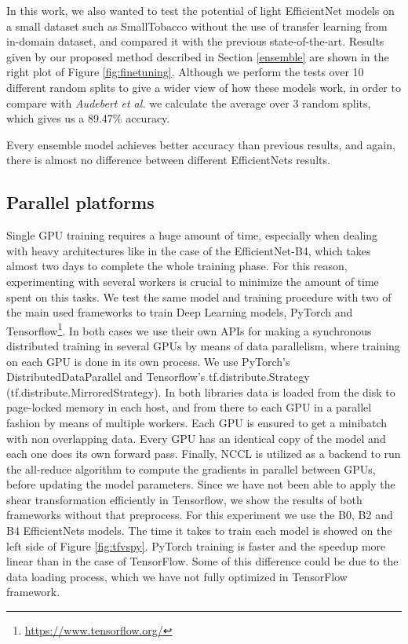\documentclass[runningheads]{llncs}
\begin{document}
In this work, we also wanted to test the potential of light EfficientNet models on a small dataset such as SmallTobacco without the use of transfer learning from in-domain dataset, and compared it with the previous state-of-the-art. Results given by our proposed method described in Section \ref{ensemble} are shown in the right plot of Figure \ref{fig:finetuning}. Although we perform the tests over 10 different random splits to give a wider view of how these models work, in order to compare with \textit{Audebert et al.} \cite{multimodal} we calculate the average over 3 random splits, which gives us a 89.47\% accuracy.

Every ensemble model achieves better accuracy than previous results, and again, there is almost no difference between different EfficientNets results.

\subsection{Parallel platforms}

Single GPU training requires a huge amount of time, especially when dealing with heavy architectures like in the case of the EfficientNet-B4, which takes almost two days to complete the whole training phase. For this reason, experimenting with several workers is crucial to minimize the amount of time spent on this tasks. We test the same model and training procedure with two of the main used frameworks to train Deep Learning models, PyTorch and Tensorflow\footnote{\url{https://www.tensorflow.org/}}. In both cases we use their own APIs for making a synchronous distributed training in several GPUs by means of data parallelism, where training on each GPU is done in its own process. We use PyTorch's DistributedDataParallel and Tensorflow's tf.distribute.Strategy (tf.distribute.MirroredStrategy). In both libraries data is loaded from the disk to page-locked memory in each host, and from there to each GPU in a parallel fashion by means of multiple workers. Each GPU is ensured to get a minibatch with non overlapping data. Every GPU has an identical copy of the model and each one does its own forward pass. Finally, NCCL is utilized as a backend to run the all-reduce algorithm to compute the gradients in parallel between GPUs, before updating the model parameters. Since we have not been able to apply the shear transformation efficiently in Tensorflow, we show the results of both frameworks without that preprocess.
For this experiment we use the B0, B2 and B4 EfficientNets models.  The time it takes to train each model is showed on the left side of Figure \ref{fig:tfvspy}. PyTorch training is faster and the speedup more linear than in the case of TensorFlow. Some of this difference could be due to the data loading process, which we have not fully optimized in TensorFlow framework.
\end{document}
